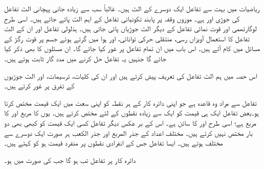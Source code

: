        ریاضیات میں بہت سے تفاعل ایک دوسرے کے الٹ ہیں۔ غالباً سب سے زیادہ جانی پہچانی الٹ تفاعل کی جوڑی  اور  ہے۔ موزوں وقفہ پر پابند تکونیاتی تفاعل کے اہم الٹ پائے  جاتے ہیں۔ اسی طرح  لوگارتھمی اور قوت نمائی تفاعل کے دیگر الٹ جوڑیاں پائی جاتی ہیں۔ ہذلولی تفاعل اور ان کے الٹ تفاعل کا استعمال آویزاں رسی، منتقلی حرکی توانائی، اور ہوا میں گرتے ہوئے جسم پر قوت رگڑ کے مسائل میں کام آتے ہیں۔ اس باب میں ان تمام تفاعل پر غور کیا جائے گا۔ ان مسئلوں کا بھی ذکر کیا جائے گا جنہیں یہ تفاعل حل کرنے میں مدد گار ثابت ہوتے ہیں۔

اس حصہ میں ہم الٹ تفاعل کی تعریف پیش کرتے ہیں اور ان کی کلیات، ترسیمات، اور الٹ جوڑیوں کے تفرق پر غور کرتے ہیں۔

تفاعل سے مراد وہ قاعدہ ہے جو اپنی دائرہ کار کے ہر نقطہ کو اپنی سعت میں ایک قیمت مختص کرتا ہو۔بعض تفاعل ایک ہی قیمت کو ایک سے زیادہ  نقطوں  کے لئے مختص کرتے ہیں۔ یوں  کا مربع اور  کا مربع  ہے؛ اسی طرح  اور  کا سائن  ہے۔ اس کے بر عکس دیگر تفاعل کسی ایک قیمت کو کبھی بھی دو بار مختص نہیں کرتے ہیں۔ مختلف اعداد کے جذر المربع اور جذر الکعب ہر صورت ایک دوسرے سے مختلف ہوتے ہیں۔ ایسا تفاعل جس کے انفرادی نقطوں پر منفرد قیمت ہو کو  کہتے ہیں۔

دائرہ کار  پر تفاعل   تب  ہو گا جب  کی صورت میں  ہو۔

